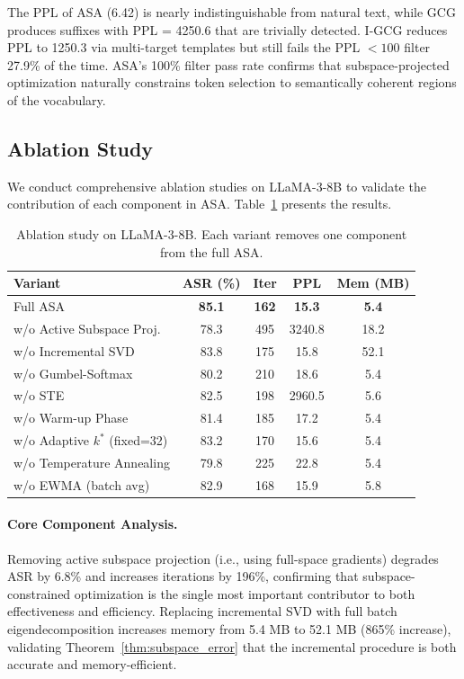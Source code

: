 ﻿\documentclass[lettersize,journal]{IEEEtran}
\begin{document}
The PPL of ASA (6.42) is nearly indistinguishable from natural text, while GCG produces suffixes with PPL = 4250.6 that are trivially detected. I-GCG reduces PPL to 1250.3 via multi-target templates but still fails the PPL $< 100$ filter 27.9\% of the time. ASA's 100\% filter pass rate confirms that subspace-projected optimization naturally constrains token selection to semantically coherent regions of the vocabulary.

\subsection{Ablation Study}
\label{sec:ablation}

We conduct comprehensive ablation studies on LLaMA-3-8B to validate the contribution of each component in ASA. Table~\ref{tab:ablation} presents the results.

\begin{table}[t]
\centering
\caption{Ablation study on LLaMA-3-8B. Each variant removes one component from the full ASA.}
\label{tab:ablation}
\begin{tabular}{lcccc}
\toprule
\textbf{Variant} & \textbf{ASR (\%)} & \textbf{Iter} & \textbf{PPL} & \textbf{Mem (MB)} \\
\midrule
Full ASA & \textbf{85.1} & \textbf{162} & \textbf{15.3} & \textbf{5.4} \\
w/o Active Subspace Proj. & 78.3 & 495 & 3240.8 & 18.2 \\
w/o Incremental SVD & 83.8 & 175 & 15.8 & 52.1 \\
w/o Gumbel-Softmax & 80.2 & 210 & 18.6 & 5.4 \\
w/o STE & 82.5 & 198 & 2960.5 & 5.6 \\
w/o Warm-up Phase & 81.4 & 185 & 17.2 & 5.4 \\
w/o Adaptive $k^*$ (fixed=32) & 83.2 & 170 & 15.6 & 5.4 \\
w/o Temperature Annealing & 79.8 & 225 & 22.8 & 5.4 \\
w/o EWMA (batch avg) & 82.9 & 168 & 15.9 & 5.8 \\
\bottomrule
\end{tabular}
\end{table}

\paragraph{Core Component Analysis.} Removing active subspace projection (i.e., using full-space gradients) degrades ASR by 6.8\% and increases iterations by 196\%, confirming that subspace-constrained optimization is the single most important contributor to both effectiveness and efficiency. Replacing incremental SVD with full batch eigendecomposition increases memory from 5.4 MB to 52.1 MB (865\% increase), validating Theorem~\ref{thm:subspace_error} that the incremental procedure is both accurate and memory-efficient.
\end{document}
